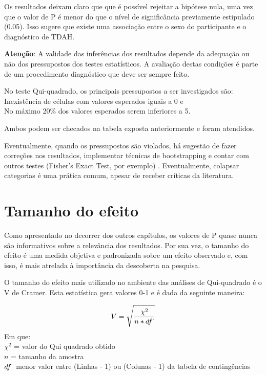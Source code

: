 \documentclass[
]{book}
\begin{document}
Os resultados deixam claro que que é possível rejeitar a hipótese nula, uma vez que o valor de P é menor do que o nível de significância previamente estipulado (0.05). Isso sugere que existe uma associação entre o sexo do participante e o diagnóstico de TDAH.

\begin{warning}

\textbf{Atenção}: A validade das inferências dos resultados depende da adequação ou não dos pressupostos dos testes estatísticos. A avaliação destas condições é parte de um procedimento diagnóstico que deve ser sempre feito.

\end{warning}

No teste Qui-quadrado, os principais pressupostos a ser investigados são:\\
Inexistência de células com valores esperados iguais a 0 e\\
No máximo 20\% dos valores esperados serem inferiores a 5.

Ambos podem ser checados na tabela exposta anteriormente e foram atendidos.

Eventualmente, quando os pressupostos são violados, há sugestão de fazer correções nos resultados, implementar técnicas de bootstrapping e contar com outros testes (Fisher's Exact Test, por exemplo) \citep{Campbell2007}. Eventualmente, colapsar categorias é uma prática comum, apesar de receber críticas da literatura.

\hypertarget{tamanho-do-efeito}{%
\section{Tamanho do efeito}\label{tamanho-do-efeito}}

Como apresentado no decorrer dos outros capítulos, os valores de P quase nunca são informativos sobre a relevância dos resultados. Por sua vez, o tamanho do efeito é uma medida objetiva e padronizada sobre um efeito observado e, com isso, é mais atrelada à importância da descoberta na pesquisa.

O tamanho do efeito mais utilizado no ambiente das análises de Qui-quadrado é o V de Cramer. Esta estatística gera valores 0-1 e é dada da seguinte maneira:

\[V=\sqrt\frac{\chi^2}{n*df^`}\]
Em que:\\
\(\chi^2\) = valor do Qui quadrado obtido\\
\(n\) = tamanho da amostra\\
\(df^`\) menor valor entre (Linhas - 1) ou (Colunas - 1) da tabela de contingências
\end{document}

